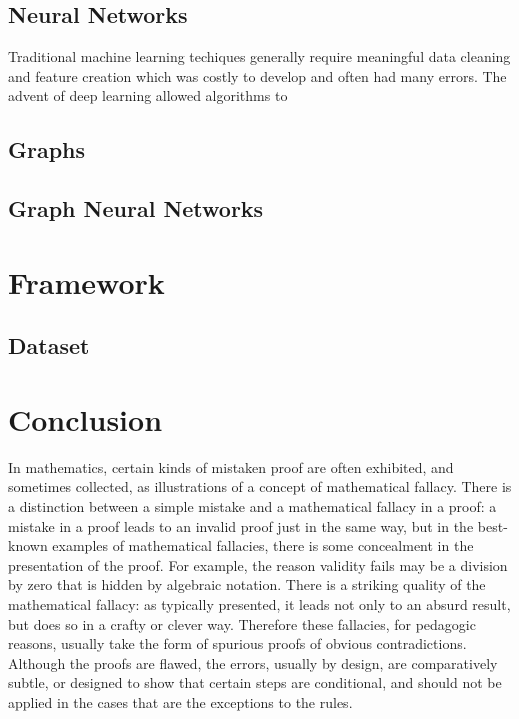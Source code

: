 \documentclass[honours,12pt]{unswthesis}
\numberwithin{equation}{section}
\begin{document}
\section{Neural Networks}\label{nn}
Traditional machine learning techiques generally require meaningful data cleaning and feature creation which was costly to develop and often had many errors.
The advent of deep learning allowed algorithms to 


\section{Graphs}\label{g}



\section{Graph Neural Networks}\label{gnn}




\chapter{Framework}\label{framework}



\section{Dataset}\label{data}




\chapter{Conclusion}\label{ccl}

In mathematics, certain kinds of mistaken proof are often exhibited, and sometimes collected, as illustrations of a concept of mathematical fallacy. There is a distinction between a simple mistake and a mathematical fallacy in a proof: a mistake in a proof leads to an invalid proof just in the same way, but in the best-known examples of mathematical fallacies, there is some concealment in the presentation of the proof. For example, the reason validity fails may be a division by zero that is hidden by algebraic notation. There is a striking quality of the mathematical fallacy: as typically presented, it leads not only to an absurd result, but does so in a crafty or clever way. Therefore these fallacies, for pedagogic reasons, usually take the form of spurious proofs of obvious contradictions. Although the proofs are flawed, the errors, usually by design, are comparatively subtle, or designed to show that certain steps are conditional, and should not be applied in the cases that are the exceptions to the rules. \\
\end{document}
